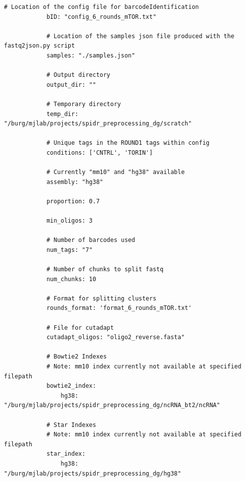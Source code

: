 \documentclass{article}
\begin{document}
\begin{enumerate}
\begin{lstlisting}[style=bashstyle]
            # Location of the config file for barcodeIdentification
            bID: "config_6_rounds_mTOR.txt"
            
            # Location of the samples json file produced with the fastq2json.py script 
            samples: "./samples.json"
            
            # Output directory  
            output_dir: ""
            
            # Temporary directory
            temp_dir: "/burg/mjlab/projects/spidr_preprocessing_dg/scratch"
            
            # Unique tags in the ROUND1 tags within config
            conditions: ['CNTRL', 'TORIN']
            
            # Currently "mm10" and "hg38" available
            assembly: "hg38"
            
            proportion: 0.7
            
            min_oligos: 3
            
            # Number of barcodes used
            num_tags: "7"
            
            # Number of chunks to split fastq
            num_chunks: 10
            
            # Format for splitting clusters
            rounds_format: 'format_6_rounds_mTOR.txt'
            
            # File for cutadapt
            cutadapt_oligos: "oligo2_reverse.fasta"
            
            # Bowtie2 Indexes
            # Note: mm10 index currently not available at specified filepath
            bowtie2_index:
                hg38: "/burg/mjlab/projects/spidr_preprocessing_dg/ncRNA_bt2/ncRNA"
            
            # Star Indexes
            # Note: mm10 index currently not available at specified filepath
            star_index:
                hg38: "/burg/mjlab/projects/spidr_preprocessing_dg/hg38"
        \end{lstlisting}


\end{enumerate}
\end{document}
